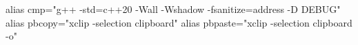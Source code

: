 alias cmp="g++ -std=c++20 -Wall -Wshadow -fsanitize=address -D DEBUG" \newline
alias pbcopy="xclip -selection clipboard" \newline
alias pbpaste="xclip -selection clipboard -o" \newline

